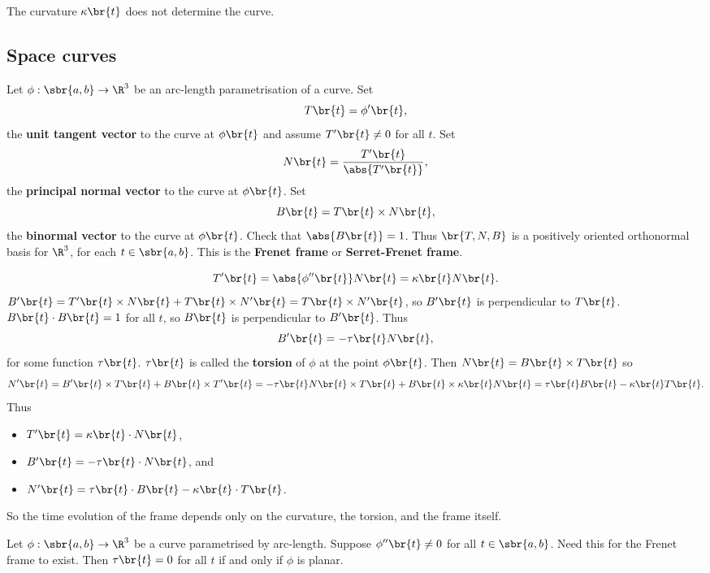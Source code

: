 The curvature $ \kappa\br{t} $ does not determine the curve.

\pagebreak

\subsection{Space curves}

Let $ \phi : \sbr{a, b} \to \R^3 $ be an arc-length parametrisation of a curve. Set
$$ T\br{t} = \phi'\br{t}, $$
the \textbf{unit tangent vector} to the curve at $ \phi\br{t} $ and assume $ T'\br{t} \ne 0 $ for all $ t $. Set
$$ N\br{t} = \dfrac{T'\br{t}}{\abs{T'\br{t}}}, $$
the \textbf{principal normal vector} to the curve at $ \phi\br{t} $. Set
$$ B\br{t} = T\br{t} \times N\br{t}, $$
the \textbf{binormal vector} to the curve at $ \phi\br{t} $. Check that $ \abs{B\br{t}} = 1 $. Thus $ \br{T, N, B} $ is a positively oriented orthonormal basis for $ \R^3 $, for each $ t \in \sbr{a, b} $. This is the \textbf{Frenet frame} or \textbf{Serret-Frenet frame}.


$$ T'\br{t} = \abs{\phi''\br{t}}N\br{t} = \kappa\br{t}N\br{t}. $$
$ B'\br{t} = T'\br{t} \times N\br{t} + T\br{t} \times N'\br{t} = T\br{t} \times N'\br{t} $, so $ B'\br{t} $ is perpendicular to $ T\br{t} $. $ B\br{t} \cdot B\br{t} = 1 $ for all $ t $, so $ B\br{t} $ is perpendicular to $ B'\br{t} $. Thus
$$ B'\br{t} = -\tau\br{t}N\br{t}, $$
for some function $ \tau\br{t} $. $ \tau\br{t} $ is called the \textbf{torsion} of $ \phi $ at the point $ \phi\br{t} $. Then $ N\br{t} = B\br{t} \times T\br{t} $ so
$$ N'\br{t} = B'\br{t} \times T\br{t} + B\br{t} \times T'\br{t} = -\tau\br{t}N\br{t} \times T\br{t} + B\br{t} \times \kappa\br{t}N\br{t} = \tau\br{t}B\br{t} - \kappa\br{t}T\br{t}. $$
Thus
\begin{itemize}
\item $ T'\br{t} = \kappa\br{t} \cdot N\br{t} $,
\item $ B'\br{t} = -\tau\br{t} \cdot N\br{t} $, and
\item $ N'\br{t} = \tau\br{t} \cdot B\br{t} - \kappa\br{t} \cdot T\br{t} $.
\end{itemize}
So the time evolution of the frame depends only on the curvature, the torsion, and the frame itself.

\begin{proposition}
Let $ \phi : \sbr{a, b} \to \R^3 $ be a curve parametrised by arc-length. Suppose $ \phi''\br{t} \ne 0 $ for all $ t \in \sbr{a, b} $. Need this for the Frenet frame to exist. Then $ \tau\br{t} = 0 $ for all $ t $ if and only if $ \phi $ is planar.
\end{proposition}

